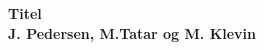 \begin{titlepage}
   
   \begin{center}
   
      \Huge\textbf{Titel}
      \\
      \Large\textbf{J. Pedersen, M.Tatar og M. Klevin}
      	\begin{center}
       \end{center}   
   \end{center}
   \thispagestyle{empty}
\end{titlepage}
